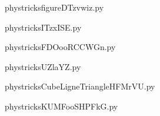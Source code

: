 
    \newcommand{\CaptionFigfigureDTzvwiz}{<+Type your caption here+>}
    \begin{center}
        
    \end{center}
    phystricksfigureDTzvwiz.py

    

    \clearpage
    


    \newcommand{\CaptionFigITzxISE}{<+Type your caption here+>}
    \begin{center}
        
    \end{center}
    phystricksITzxISE.py

    

    \clearpage
    


    \newcommand{\CaptionFigFDOooRCCWGn}{<+Type your caption here+>}
    \begin{center}
        
    \end{center}
    phystricksFDOooRCCWGn.py

    

    \clearpage
    


    \newcommand{\CaptionFigUZlaYZ}{<+Type your caption here+>}
    \begin{center}
        
    \end{center}
    phystricksUZlaYZ.py

    

    \clearpage
    


    \newcommand{\CaptionFigCubeLigneTriangleHFMrVU}{<+Type your caption here+>}
    \begin{center}
        
    \end{center}
    phystricksCubeLigneTriangleHFMrVU.py

    

    \clearpage
    


    \newcommand{\CaptionFigKUMFooSHPFkG}{<+Type your caption here+>}
    \begin{center}
        
    \end{center}
    phystricksKUMFooSHPFkG.py

